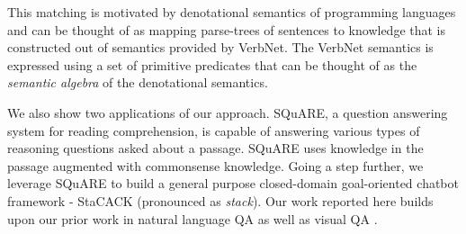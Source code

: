 \documentclass[letterpaper]{article}
\begin{document}
This matching is motivated by denotational semantics of programming languages and can be thought of as mapping parse-trees of sentences to knowledge that is constructed out of semantics provided by VerbNet. The VerbNet semantics is expressed using a set of primitive predicates that can be thought of as the \textit{semantic algebra} of the denotational semantics.

We also show two applications of our approach. SQuARE, a question answering system for reading comprehension, is capable of answering various types of reasoning questions asked about a passage. SQuARE uses knowledge in the passage augmented with commonsense knowledge. Going a step further, we leverage SQuARE to build a general purpose closed-domain goal-oriented chatbot framework - StaCACK (pronounced as \textit{stack}). Our work reported here builds upon our prior work in natural language QA as well as visual QA \cite{caspr,aqua,square}.
\end{document}
